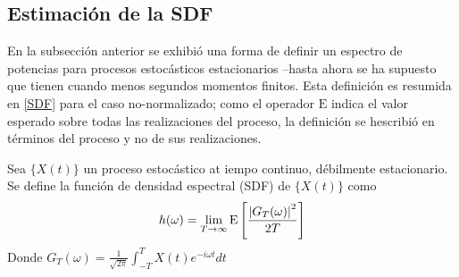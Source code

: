 
\subsection{Estimaci\'on de la SDF}

En la subsecci\'on anterior se exhibi\'o una forma de definir un espectro de potencias para 
procesos estoc\'asticos estacionarios --hasta ahora se ha supuesto que tienen cuando menos
segundos momentos finitos. Esta definici\'on es resumida en \ref{SDF} para el caso no-normalizado;
como el operador $\mathrm{E}$ indica el valor esperado sobre todas las realizaciones del proceso,
la definici\'on se hescribi\'o en t\'erminos del proceso y no de sus realizaciones.

\begin{defn}
Sea $\{X(t)\}$ un proceso estoc\'astico at iempo continuo, d\'ebilmente estacionario. Se define
la funci\'on de densidad espectral (SDF) de $\{X(t)\}$ como
\begin{equation*}
h(\omega) = \lim_{T\rightarrow \infty} \mathrm{E}\left[  \frac{ \left| G_T(\omega) \right|^{2}}{2 T}  \right]
\end{equation*}
Donde $G_T (\omega) = \frac{1}{\sqrt{2 \pi}} \int_{-T}^{T} X(t) e^{-i \omega t} dt$
\label{SDF}
\end{defn}



%


